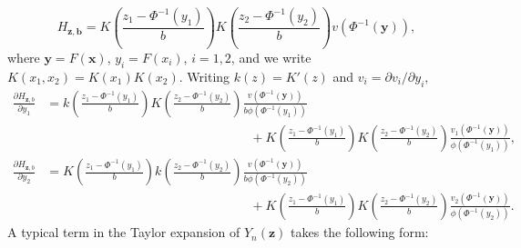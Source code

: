 \documentclass[
  12pt,
  letterpaper]{article}
\numberwithin{equation}{section}
\newcommand{\x}{\bm{x}}
\newcommand{\z}{\bm{z}}
\newcommand{\y}{\bm{y}}
\newcommand{\hh}{\bm{b}}
\begin{document}
\[H_{\z,\hh} = K\left(\frac{z_1 - \Phi^{-1}(y_1)}{b}\right)K\left(\frac{z_2 - \Phi^{-1}(y_2)}{b}\right)v(\Phi^{-1}(\y)),\]
where \(\y = F(\x)\), \(y_i = F(x_i)\), \(i=1,2\), and we write \(K(x_1,x_2) = K(x_1)K(x_2)\). Writing \(k(z) = K'(z)\) and \(v_{i} = \partial v_i/\partial y_i,\)
\begin{align*}
\frac{\partial H_{\bm{z},b}}{\partial y_1} 
&= k\left(\frac{z_1 - \Phi^{-1}(y_1)}{b}\right) K\left(\frac{z_2 - \Phi^{-1}(y_2)}{b}\right) \frac{v(\Phi^{-1}(\y))}{b\phi(\Phi^{-1}(y_1))} \\
& \qquad\qquad\qquad\qquad\qquad\qquad\qquad\qquad +  K\left(\frac{z_1 - \Phi^{-1}(y_1)}{b}\right) K\left(\frac{z_2 - \Phi^{-1}(y_2)}{b}\right) \frac{v_1(\Phi^{-1}(\y))}{\phi(\Phi^{-1}(y_1))}, \\
\frac{\partial H_{\bm{z},b}}{\partial y_2} 
&= K\left(\frac{z_1 - \Phi^{-1}(y_1)}{b}\right) k\left(\frac{z_2 - \Phi^{-1}(y_2)}{b}\right) \frac{v(\Phi^{-1}(\y))}{b\phi(\Phi^{-1}(y_2))} \\
& \qquad\qquad\qquad\qquad\qquad\qquad\qquad\qquad+  K\left(\frac{z_1 - \Phi^{-1}(y_1)}{b}\right) K\left(\frac{z_2 - \Phi^{-1}(y_2)}{b}\right) \frac{v_2(\Phi^{-1}(\y))}{\phi(\Phi^{-1}(y_2))}.
\end{align*}
A typical term in the Taylor expansion of \(Y_n(\z)\) takes the following form:
\end{document}
